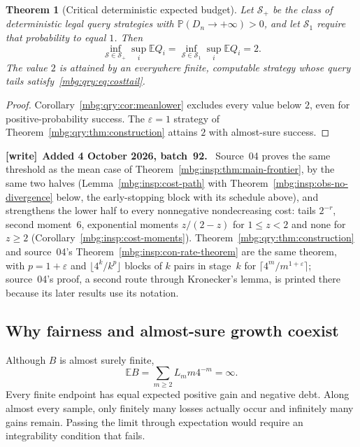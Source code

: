 \documentclass[11pt,letterpaper]{article}
\newtheorem{theorem}{Theorem}[section]
\theoremstyle{definition}
\newcommand{\E}{\mathbb E}
\newcommand{\Prb}{\mathbb P}
\newenvironment{writenote}[1][]{\par\smallskip\begingroup\small
 \noindent\textbf{[write]}\if\relax\detokenize{#1}\relax\else~\textbf{#1.}\fi\ }%
 {\par\endgroup\smallskip}
\begin{document}
\begin{theorem}[Critical deterministic expected budget]
\label{mbg:qry:thm:threshold}
Let \(\mathcal S_+\) be the class of deterministic legal query strategies
with \(\Prb(D_n\to+\infty)>0\), and let \(\mathcal S_1\) require that
probability to equal \(1\). Then
\begin{equation}
 \inf_{\mathcal S\in\mathcal S_+}\sup_i\E Q_i
 =
 \inf_{\mathcal S\in\mathcal S_1}\sup_i\E Q_i
 =2.
 \label{mbg:qry:eq:threshold}
\end{equation}
The value \(2\) is attained by an everywhere finite, computable strategy
whose query tails satisfy~\eqref{mbg:qry:eq:costtail}.
\end{theorem}

\begin{proof}
Corollary~\ref{mbg:qry:cor:meanlower} excludes every value below \(2\), even
for positive-probability success. The \(\varepsilon=1\) strategy of
Theorem~\ref{mbg:qry:thm:construction} attains \(2\) with almost-sure success.
\end{proof}

\begin{writenote}[Added 4 October 2026, batch~92]
Source~04 proves the same threshold as the mean case of Theorem~\ref{mbg:insp:thm:main-frontier}, by the same two halves (Lemma~\ref{mbg:insp:cost-path} with Theorem~\ref{mbg:insp:obs-no-divergence} below, the early-stopping block with its schedule above), and strengthens the lower half to every nonnegative nondecreasing cost: tails $2^{-r}$, second moment~$6$, exponential moments $z/(2-z)$ for $1\le z<2$ and none for $z\ge2$ (Corollary~\ref{mbg:insp:cost-moments}). Theorem~\ref{mbg:qry:thm:construction} and source~04's Theorem~\ref{mbg:insp:con-rate-theorem} are the same theorem, with $p=1+\varepsilon$ and $\lfloor4^k/k^p\rfloor$ blocks of $k$ pairs in stage~$k$ for $\lceil4^m/m^{1+\varepsilon}\rceil$; source~04's proof, a second route through Kronecker's lemma, is printed there because its later results use its notation.
\end{writenote}

\subsection{Why fairness and almost-sure growth coexist}

Although \(B\) is almost surely finite,
\begin{equation}
 \E B=\sum_{m\ge2}L_m m4^{-m}=\infty.
 \label{mbg:qry:eq:debtmean}
\end{equation}
Every finite endpoint has equal expected positive gain and negative
debt. Along almost every sample, only finitely many losses actually
occur and infinitely many gains remain. Passing the limit through
expectation would require an integrability condition that fails.
\end{document}
